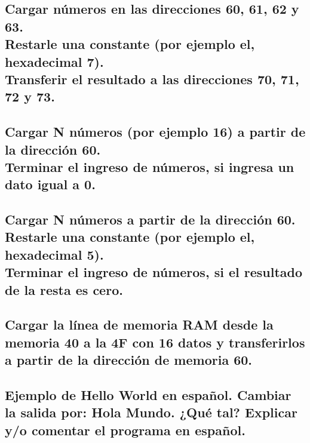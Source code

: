\documentclass{article}
\begin{document}
\pagebreak
\setcounter{section}{2}
\setcounter{subsection}{0}
\subsection{Cargar números en las direcciones 60, 61, 62 y 63.\\
            Restarle una constante (por ejemplo el, hexadecimal 7).\\
            Transferir el resultado a las direcciones 70, 71, 72 y 73.}

\subsection{Cargar N números (por ejemplo 16) a partir de la dirección 60.\\
            Terminar el ingreso de números, si ingresa un dato igual a 0.}

\subsection{Cargar N números a partir de la dirección 60.\\
            Restarle una constante (por ejemplo el, hexadecimal 5).\\
            Terminar el ingreso de números, si el resultado de la resta es cero.}

\subsection{Cargar la línea de memoria RAM desde la memoria 40 a la 4F con 16 datos y transferirlos a partir de la dirección de memoria 60.}

\pagebreak
\subsection{Ejemplo de Hello World en español. Cambiar la salida por: Hola Mundo. ¿Qué tal? Explicar y/o comentar el programa en español.}
\end{document}
